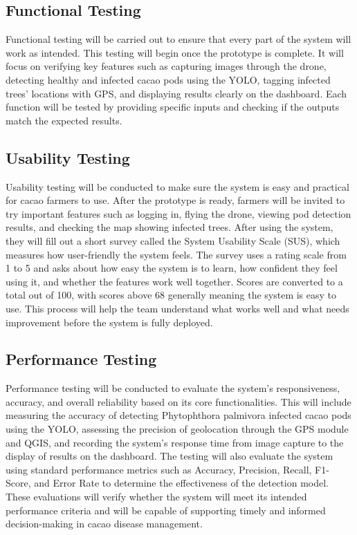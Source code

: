 \subsection{Functional Testing}

Functional testing will be carried out to ensure that every part of the system will work as intended. This testing will begin once the prototype is complete. It will focus on verifying key features such as capturing images through the drone, detecting healthy and infected cacao pods using the YOLO, tagging infected trees’ locations with GPS, and displaying results clearly on the dashboard. Each function will be tested by providing specific inputs and checking if the outputs match the expected results.

\subsection{Usability Testing}

Usability testing will be conducted to make sure the system is easy and practical for cacao farmers to use. After the prototype is ready, farmers will be invited to try important features such as logging in, flying the drone, viewing pod detection results, and checking the map showing infected trees. After using the system, they will fill out a short survey called the System Usability Scale (SUS), which measures how user-friendly the system feels. The survey uses a rating scale from 1 to 5 and asks about how easy the system is to learn, how confident they feel using it, and whether the features work well together. Scores are converted to a total out of 100, with scores above 68 generally meaning the system is easy to use. This process will help the team understand what works well and what needs improvement before the system is fully deployed.
\pagebreak

\subsection*{Performance Testing}

Performance testing will be conducted to evaluate the system’s responsiveness, accuracy, and overall reliability based on its core functionalities. This will include measuring the accuracy of detecting Phytophthora palmivora infected cacao pods using the YOLO, assessing the precision of geolocation through the GPS module and QGIS, and recording the system’s response time from image capture to the display of results on the dashboard. The testing will also evaluate the system using standard performance metrics such as Accuracy, Precision, Recall, F1-Score, and Error Rate to determine the effectiveness of the detection model. These evaluations will verify whether the system will meet its intended performance criteria and will be capable of supporting timely and informed decision-making in cacao disease management.

